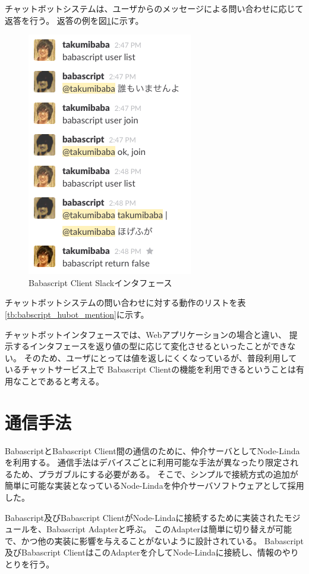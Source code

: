 チャットボットシステムは、ユーザからのメッセージによる問い合わせに応じて返答を行う。
返答の例を図\ref{fig:babascript_client_slack}に示す。

\begin{figure}[htbp]
  \begin{center}
  \includegraphics[width=.3\linewidth,bb=0 0 273 402]{images/babascript_client_slack.png}
  \end{center}
  \caption{Babascript Client Slackインタフェース}
  \label{fig:babascript_client_slack}
\end{figure}

チャットボットシステムの問い合わせに対する動作のリストを表\ref{tb:babscript_hubot_mention}に示す。

チャットボットインタフェースでは、Webアプリケーションの場合と違い、
提示するインタフェースを返り値の型に応じて変化させるといったことができない。
そのため、ユーザにとっては値を返しにくくなっているが、普段利用しているチャットサービス上で
Babascript
Clientの機能を利用できるということは有用なことであると考える。

\section{通信手法}\label{ux901aux4fe1ux624bux6cd5}

BabascriptとBabascript
Client間の通信のために、仲介サーバとしてNode-Lindaを利用する。
通信手法はデバイスごとに利用可能な手法が異なったり限定されるため、プラガブルにする必要がある。
そこで、シンプルで接続方式の追加が簡単に可能な実装となっているNode-Lindaを仲介サーバソフトウェアとして採用した。

Babascript及びBabascript
ClientがNode-Lindaに接続するために実装されたモジュールを、Babascript
Adapterと呼ぶ。
このAdapterは簡単に切り替えが可能で、かつ他の実装に影響を与えることがないように設計されている。
Babascript及びBabascript
ClientはこのAdapterを介してNode-Lindaに接続し、情報のやりとりを行う。

